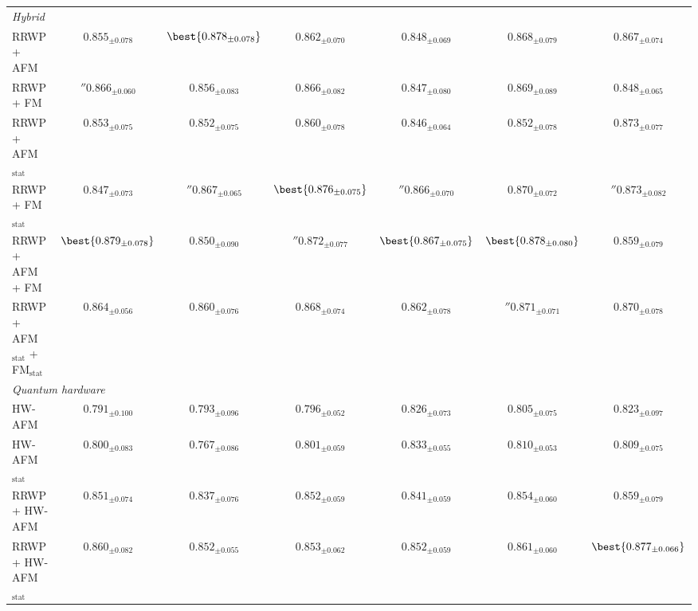 \begin{table}
{\begin{tabular}{l c c c c c c}
\midrule
\multicolumn{7}{l}{\textit{Hybrid}} \\
  RRWP + AFM & $0.855{_{\pm 0.078}}$ & $\best{0.878{_{\pm 0.078}}}$ & $0.862{_{\pm 0.070}}$ & $0.848{_{\pm 0.069}}$ & $0.868{_{\pm 0.079}}$ & $0.867{_{\pm 0.074}}$ \\
  RRWP + FM & $\second{0.866}{_{\pm 0.060}}$ & $0.856{_{\pm 0.083}}$ & $0.866{_{\pm 0.082}}$ & $0.847{_{\pm 0.080}}$ & $0.869{_{\pm 0.089}}$ & $0.848{_{\pm 0.065}}$ \\
  RRWP + AFM$_{\text{stat}}$ & $0.853{_{\pm 0.075}}$ & $0.852{_{\pm 0.075}}$ & $0.860{_{\pm 0.078}}$ & $0.846{_{\pm 0.064}}$ & $0.852{_{\pm 0.078}}$ & $0.873{_{\pm 0.077}}$ \\
  RRWP + FM$_{\text{stat}}$ & $0.847{_{\pm 0.073}}$ & $\second{0.867}{_{\pm 0.065}}$ & $\best{0.876{_{\pm 0.075}}}$ & $\second{0.866}{_{\pm 0.070}}$ & $0.870{_{\pm 0.072}}$ & $\second{0.873}{_{\pm 0.082}}$ \\
  RRWP + AFM + FM & $\best{0.879{_{\pm 0.078}}}$ & $0.850{_{\pm 0.090}}$ & $\second{0.872}{_{\pm 0.077}}$ & $\best{0.867{_{\pm 0.075}}}$ & $\best{0.878{_{\pm 0.080}}}$ & $0.859{_{\pm 0.079}}$ \\
  RRWP + AFM$_{\text{stat}}$ + FM$_{\text{stat}}$ & $0.864{_{\pm 0.056}}$ & $0.860{_{\pm 0.076}}$ & $0.868{_{\pm 0.074}}$ & $0.862{_{\pm 0.078}}$ & $\second{0.871}{_{\pm 0.071}}$ & $0.870{_{\pm 0.078}}$ \\
\midrule
\multicolumn{7}{l}{\textit{Quantum hardware}} \\
  HW-AFM & $0.791{_{\pm 0.100}}$ & $0.793{_{\pm 0.096}}$ & $0.796{_{\pm 0.052}}$ & $0.826{_{\pm 0.073}}$ & $0.805{_{\pm 0.075}}$ & $0.823{_{\pm 0.097}}$ \\
  HW-AFM$_{\text{stat}}$ & $0.800{_{\pm 0.083}}$ & $0.767{_{\pm 0.086}}$ & $0.801{_{\pm 0.059}}$ & $0.833{_{\pm 0.055}}$ & $0.810{_{\pm 0.053}}$ & $0.809{_{\pm 0.075}}$ \\
  RRWP + HW-AFM & $0.851{_{\pm 0.074}}$ & $0.837{_{\pm 0.076}}$ & $0.852{_{\pm 0.059}}$ & $0.841{_{\pm 0.059}}$ & $0.854{_{\pm 0.060}}$ & $0.859{_{\pm 0.079}}$ \\
  RRWP + HW-AFM$_{\text{stat}}$ & $0.860{_{\pm 0.082}}$ & $0.852{_{\pm 0.055}}$ & $0.853{_{\pm 0.062}}$ & $0.852{_{\pm 0.059}}$ & $0.861{_{\pm 0.060}}$ & $\best{0.877{_{\pm 0.066}}}$ \\
\bottomrule
\end{tabular}
}
\end{table}
